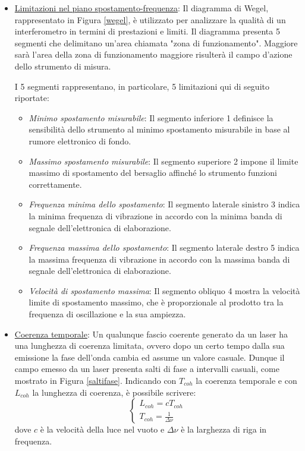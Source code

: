 \begin{itemize}
	\item \underline{Limitazioni nel piano spostamento-frequenza}: Il diagramma di Wegel, rappresentato in Figura \ref{wegel}, è utilizzato per analizzare la qualità di un interferometro in termini di prestazioni e limiti. Il diagramma presenta 5 segmenti che delimitano un'area chiamata "zona di funzionamento". Maggiore sarà l'area della zona di funzionamento maggiore risulterà il campo d'azione dello strumento di misura.
 
		I 5 segmenti rappresentano, in particolare, 5 limitazioni qui di seguito riportate:
		\begin{itemize}
		\item \textit{Minimo spostamento misurabile}: Il segmento inferiore 1 definisce la sensibilità dello strumento al minimo spostamento misurabile in base al rumore elettronico di fondo.
		\item \textit{Massimo spostamento misurabile}: Il segmento superiore 2 impone il limite massimo di spostamento del bersaglio affinché lo strumento funzioni correttamente.
		\item \textit{Frequenza minima dello spostamento}: Il segmento laterale sinistro 3 indica la minima frequenza di vibrazione in accordo con la minima banda di segnale dell'elettronica di elaborazione.
		\item \textit{Frequenza massima dello spostamento}: Il segmento laterale destro 5 indica la massima frequenza di vibrazione in accordo con la massima banda di segnale dell'elettronica di elaborazione.
		\item \textit{Velocità di spostamento massima}: Il segmento obliquo 4 mostra la velocità limite di spostamento massimo, che è proporzionale al prodotto tra la frequenza di oscillazione e la sua ampiezza.
		\end{itemize}
	
	\item \underline{Coerenza temporale}: Un qualunque fascio coerente generato da un laser ha una lunghezza di coerenza limitata, ovvero dopo un certo tempo dalla sua emissione la fase dell'onda cambia ed assume un valore casuale. Dunque il campo emesso da un laser presenta salti di fase a intervalli casuali, come mostrato in Figura \ref{saltifase}. Indicando con $T_{coh}$ la coerenza temporale e con $L_{coh}$ la lunghezza di coerenza, è possibile scrivere:
		\begin{equation}
			\begin{cases}
				L_{coh}=cT_{coh}\\T_{coh}=\frac{1}{\Delta \nu}
			\end{cases}
		\end{equation}
		dove $c$ è la velocità della luce nel vuoto e $\Delta \nu$ è la larghezza di riga in frequenza.
		

\end{itemize}
